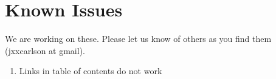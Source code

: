 \section{Known Issues}

We are working on these.  Please let us know of others as you find them (jxxcarlson at gmail).

\begin{enumerate}

\item Links in table of contents do not work

\end{enumerate}

